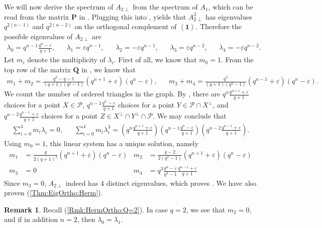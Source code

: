 \documentclass[a4paper]{article}
\theoremstyle{definition}
\newtheorem{rmk}[thm]{Remark}
\newcommand{\eps}{\varepsilon}
\newcommand{\vspan}[1]{\left \langle #1 \right \rangle}
\newcommand{\one}{\mathbf 1}
\newcommand{\pp}{\mathcal P}
\begin{document}
We will now derive the spectrum of $A_{2\perp}$ from the spectrum of $A_1$, which can be read from the matrix $\mathbf P$ in .
Plugging this into , yields that $A_{2\perp}^2$ has eigenvalues $q^{2(n-1)}$ and $q^{2(n-2)}$ on the orthogonal complement of $\vspan \one$.
Therefore the possible eigenvalues of $A_{2\perp}$ are
\begin{align*}
 \lambda_0 = q^{n-1} \frac{q^n-\eps}{q+1}, &&
 \lambda_1 = \eps q^{n-1}, &&
 \lambda_2 = - \eps q^{n-1}, &&
 \lambda_3 = \eps q^{n-2}, &&
 \lambda_4 = -\eps q^{n-2}.
\end{align*}
Let $m_i$ denote the multiplicity of $\lambda_i$.
First of all, we know that $m_0 = 1$.
From the top row of the matrix $\mathbf Q$ in , we know that
\begin{align*}
    m_1 + m_2 = \frac{q^2-q-1}{(q+1)(q^2-1)}\left( q^{n+1} + \eps \right) \left( q^n - \eps \right), &&
    m_3 + m_4 = \frac{q^3}{(q+1)(q^2-1)} \left( q^{n-1} + \eps \right)\left( q^n - \eps \right).
\end{align*}
We count the number of ordered triangles in the graph.
By , there are $q^n \frac{q^{n+1}+\eps}{q+1}$ choices for a point $X \in \pp$, $q^{n-1} \frac{q^n-\eps}{q+1}$ choices for a point $Y \in \pp \cap X^\perp$, and $q^{n-2} \frac{q^{n-1}+\eps}{q+1}$ choices for a point $Z \in X^\perp \cap Y^\perp \cap \pp$.
We may conclude that
\begin{align*}
 \sum_{i=0}^4 m_i \lambda_i = 0, &&
 \sum_{i=0}^4 m_i \lambda_i^3 = \left( q^n \frac{q^{n+1}+\eps}{q+1} \right) \left( q^{n-1} \frac{q^n-\eps}{q+1} \right) \left( q^{n-2} \frac{q^{n-1}+\eps}{q+1} \right).
\end{align*}
Using $m_0=1$, this linear system has a unique solution, namely
\begin{align*}
 m_1 &= \frac q {2(q+1)^2} \left( q^{n+1}+\eps \right) \left(q^n - \eps \right) &
 m_2 &= \frac {q-2} {2(q^2-1)} \left( q^{n+1}+\eps \right) \left(q^n - \eps \right) \\
 m_3 &= 0 &
 m_4 &= q^3 \frac{q^n-\eps}{q^2-1} \frac{q^{n-1}+\eps}{q+1} 
\end{align*}
Since $m_3 = 0$, $A_{2\perp}$ indeed has 4 distinct eigenvalues, which proves .
We have also proven  (\ref{Thm:EigOrtho:Herm}).

\begin{rmk}
 Recall  (\ref{Rmk:HermOrtho:Q=2}).
 In case $q=2$, we see that $m_2 = 0$, and if in addition $n=2$, then $\lambda_0 = \lambda_1$.
\end{rmk}
\end{document}
